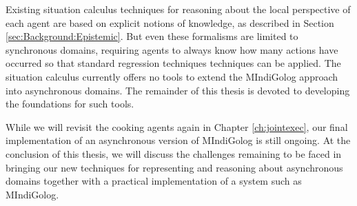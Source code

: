 Existing situation calculus techniques for reasoning about the local
perspective of each agent are based on explicit notions of knowledge,
as described in Section \ref{sec:Background:Epistemic}. But even
these formalisms are limited to synchronous domains, requiring agents
to always know how many actions have occurred so that standard regression
techniques techniques can be applied. The situation calculus currently
offers no tools to extend the MIndiGolog approach into asynchronous
domains. The remainder of this thesis is devoted to developing the
foundations for such tools.

While we will revisit the cooking agents again in Chapter \ref{ch:jointexec},
our final implementation of an asynchronous version of MIndiGolog
is still ongoing. At the conclusion of this thesis, we will discuss
the challenges remaining to be faced in bringing our new techniques
for representing and reasoning about asynchronous domains together
with a practical implementation of a system such as MIndiGolog.

